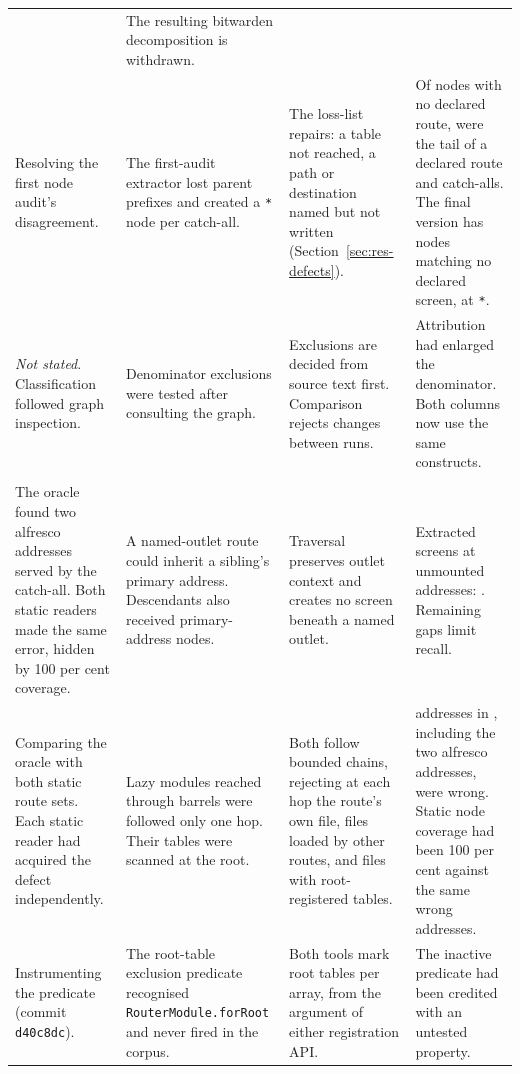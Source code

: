 \begin{xltabular}{\textwidth}{@{}YYYY@{}}
  & The resulting bitwarden decomposition is withdrawn. \\
Resolving the first node audit's disagreement.
  & The first-audit extractor lost parent prefixes and created a \texttt{*} node per catch-all.
  & The loss-list repairs: a table not reached, a path or destination named but not written (Section~\ref{sec:res-defects}).
  & Of \RoundTwoFirstRoundExtra{} nodes with no declared route, \RoundTwoFirstRoundTruncated{} were the tail of a declared route and \RoundTwoFirstRoundSynthetic{} catch-alls. The final version has \RoundTwoExtraNodes{} nodes matching no declared screen, \RoundTwoExtraNodesWildcard{} at \texttt{*}. \\
\emph{Not stated}. Classification followed graph inspection.
  & Denominator exclusions were tested after consulting the graph.
  & Exclusions are decided from source text first. Comparison rejects changes between runs.
  & Attribution had enlarged the denominator. Both columns now use the same \RoundTwoInScope{} constructs. \\
\addlinespace
{} \\
The oracle found two alfresco addresses served by the catch-all. Both static readers made the same error, hidden by 100 per cent coverage.
  & A named-outlet route could inherit a sibling's primary address. Descendants also received primary-address nodes.
  & Traversal preserves outlet context and creates no screen beneath a named outlet.
  & Extracted screens at unmounted addresses: \ProbeInvented{}. Remaining gaps limit recall. \\
Comparing the oracle with both static route sets. Each static reader had acquired the defect independently.
  & Lazy modules reached through barrels were followed only one hop. Their tables were scanned at the root.
  & Both follow bounded chains, rejecting at each hop the route's own file, files loaded by other routes, and files with root-registered tables.
  & \ProbeBeforeNotMounted{} addresses in \ProbeBeforeWhere{}, including the two alfresco addresses, were wrong. Static node coverage had been 100 per cent against the same wrong addresses. \\
Instrumenting the predicate (commit \texttt{d40c8dc}).
  & The root-table exclusion predicate recognised \texttt{RouterModule.\allowbreak forRoot} and never fired in the corpus.
  & Both tools mark root tables per array, from the argument of either registration API.
  & The inactive predicate had been credited with an untested property. \\

\end{xltabular}
